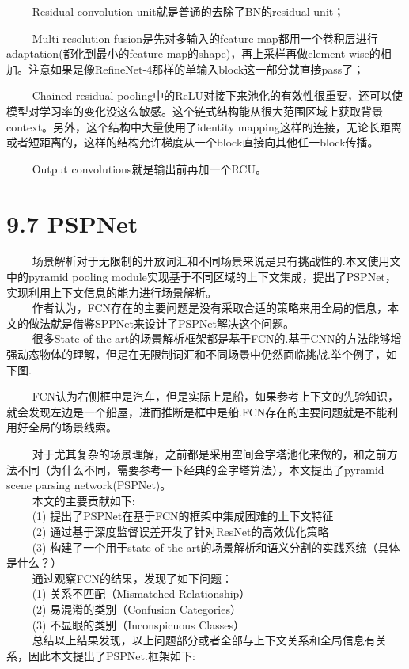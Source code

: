 \begin{figure}
\centering
\end{figure}

   Residual convolution unit就是普通的去除了BN的residual unit；

   Multi-resolution fusion是先对多输入的feature
map都用一个卷积层进行adaptation(都化到最小的feature
map的shape)，再上采样再做element-wise的相加。注意如果是像RefineNet-4那样的单输入block这一部分就直接pass了；

   Chained residual
pooling中的ReLU对接下来池化的有效性很重要，还可以使模型对学习率的变化没这么敏感。这个链式结构能从很大范围区域上获取背景context。另外，这个结构中大量使用了identity
mapping这样的连接，无论长距离或者短距离的，这样的结构允许梯度从一个block直接向其他任一block传播。

   Output convolutions就是输出前再加一个RCU。

\section{9.7 PSPNet}\label{pspnet}

  
场景解析对于无限制的开放词汇和不同场景来说是具有挑战性的.本文使用文中的pyramid
pooling
module实现基于不同区域的上下文集成，提出了PSPNet，实现利用上下文信息的能力进行场景解析。\\
  
作者认为，FCN存在的主要问题是没有采取合适的策略来用全局的信息，本文的做法就是借鉴SPPNet来设计了PSPNet解决这个问题。\\
  
很多State-of-the-art的场景解析框架都是基于FCN的.基于CNN的方法能够增强动态物体的理解，但是在无限制词汇和不同场景中仍然面临挑战.举个例子，如下图.

  
FCN认为右侧框中是汽车，但是实际上是船，如果参考上下文的先验知识，就会发现左边是一个船屋，进而推断是框中是船.FCN存在的主要问题就是不能利用好全局的场景线索。

  
对于尤其复杂的场景理解，之前都是采用空间金字塔池化来做的，和之前方法不同（为什么不同，需要参考一下经典的金字塔算法），本文提出了pyramid
scene parsing network(PSPNet)。\\
   本文的主要贡献如下:\\
   (1) 提出了PSPNet在基于FCN的框架中集成困难的上下文特征\\
   (2) 通过基于深度监督误差开发了针对ResNet的高效优化策略\\
   (3)
构建了一个用于state-of-the-art的场景解析和语义分割的实践系统（具体是什么？）\\
   通过观察FCN的结果，发现了如下问题：\\
   (1) 关系不匹配（Mismatched Relationship）\\
   (2) 易混淆的类别（Confusion Categories）\\
   (3) 不显眼的类别（Inconspicuous Classes）\\
  
总结以上结果发现，以上问题部分或者全部与上下文关系和全局信息有关系，因此本文提出了PSPNet.框架如下:

